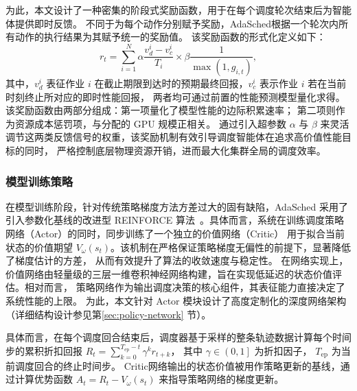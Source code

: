 为此，本文设计了一种密集的阶段式奖励函数，用于在每个调度轮次结束后为智能体提供即时反馈。
不同于为每个动作分别赋予奖励，AdaSched根据一个轮次内所有动作的执行结果为其赋予统一的奖励值。
该奖励函数的形式化定义如下：
\begin{equation}\label{eq:reward}
  r_t = \sum_{i=1}^{N} \alpha \frac{v_d^i - v_c^i}{T_i} \times \beta \frac{1}{\max\left(1, g_{i,t}\right)},
\end{equation}
其中，$v_d^i$ 表征作业 $i$ 在截止期限到达时的预期最终回报，$v_c^i$ 表示作业 $i$ 若在当前时刻终止所对应的即时性能回报，
两者均可通过前置的性能预测模型量化求得。该奖励函数由两部分组成：第一项量化了模型性能的边际积累速率；
第二项则作为资源成本惩罚项，与分配的 GPU 规模正相关。
通过引入超参数 $\alpha$ 与 $\beta$ 来灵活调节这两类反馈信号的权重，该奖励机制有效引导调度智能体在追求高价值性能目标的同时，
严格控制底层物理资源开销，进而最大化集群全局的调度效率。

\subsubsection{模型训练策略}\label{subsec:training}
在模型训练阶段，针对传统策略梯度方法方差过大的固有缺陷，AdaSched 采用了引入参数化基线的改进型 
REINFORCE 算法~\cite{williams1992simple}。具体而言，系统在训练调度策略网络（Actor）的同时，同步训练了一个独立的价值网络（Critic）
用于拟合当前状态的价值期望 $V_\omega\left(s_t\right)$。该机制在严格保证策略梯度无偏性的前提下，显著降低了梯度估计的方差，
从而有效提升了算法的收敛速度与稳定性。
在网络实现上，价值网络由轻量级的三层一维卷积神经网络构建，旨在实现低延迟的状态价值评估。相对而言，
策略网络作为输出调度决策的核心组件，其表征能力直接决定了系统性能的上限。
为此，本文针对 Actor 模块设计了高度定制化的深度网络架构（详细结构设计参见第\ref{sec:policy-network} 节）。

具体而言，在每个调度回合结束后，调度器基于采样的整条轨迹数据计算每个时间步的累积折扣回报
$R_t = \sum_{k=0}^{T_\mathrm{ep}-t} \gamma^k r_{t+k}$，
其中 $\gamma \in \left(0, 1\right]$ 为折扣因子， $T_\mathrm{ep}$ 为当前调度回合的终止时间步。
Critic网络输出的状态价值被用作策略更新的基线，通过计算优势函数 $A_t = R_t - V_\omega\left(s_t\right)$ 
来指导策略网络的梯度更新。

